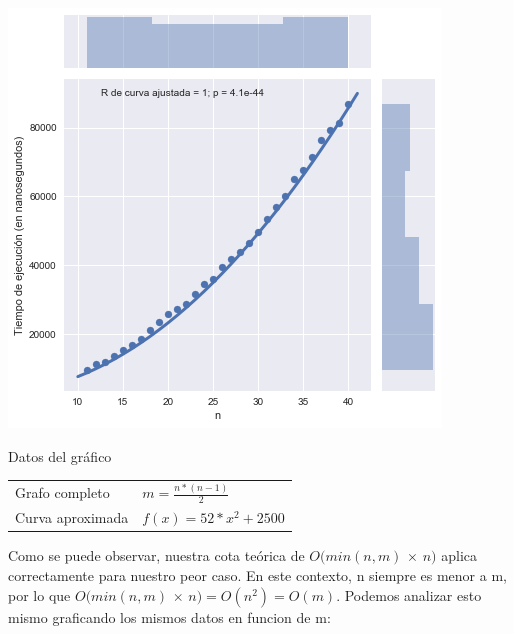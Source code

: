 \noindent
\begin{minipage}{0.55\textwidth}
    \hfill
    \includegraphics[scale=0.6]{img/greedy-complete.png}
\end{minipage}
\hfill
\begin{minipage}{0.44\textwidth}
    \begin{center}
        Datos del gráfico

        \begin{tabular}{ | l l |}
            \hline
            Grafo completo & $m = \frac{n * (n-1)}{2}$\\ 
            Curva aproximada & $f(x) = 52 * x^2 + 2500$ \\
            \hline
        \end{tabular}
    \end{center}
\end{minipage}

Como se puede observar, nuestra cota teórica de $O(min(n,m)$ $\times$ $n)$ aplica correctamente para nuestro peor caso. En este contexto, n siempre es menor a m, por lo que $O(min(n,m)$ $\times$ $n) = O(n^2) = O(m)$. Podemos analizar esto mismo graficando los mismos datos en funcion de m:

